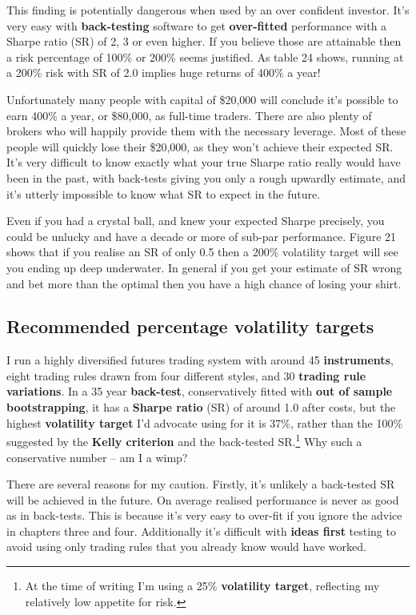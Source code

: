 This finding is potentially dangerous when used by an over confident investor. It's very easy with \textbf{back-testing} software to get \textbf{over-fitted} performance with a Sharpe ratio (SR) of 2, 3 or even higher. If you believe those are attainable then a risk percentage of 100\% or 200\% seems justified. As table 24 shows, running at a 200\% risk with SR of 2.0 implies huge returns of 400\% a year!

Unfortunately many people with capital of \$20,000 will conclude it's possible to earn 400\% a year, or \$80,000, as full-time traders. There are also plenty of brokers who will happily provide them with the necessary leverage. Most of these people will quickly lose their \$20,000, as they won't achieve their expected SR. It's very difficult to know exactly what your true Sharpe ratio really would have been in the past, with back-tests giving you only a rough upwardly estimate, and it's utterly impossible to know what SR to expect in the future.

Even if you had a crystal ball, and knew your expected Sharpe precisely, you could be unlucky and have a decade or more of sub-par performance. Figure 21 shows that if you realise an SR of only 0.5 then a 200\% volatility target will see you ending up deep underwater. In general if you get your estimate of SR wrong and bet more than the optimal then you have a high chance of losing your shirt.

\subsection*{Recommended percentage volatility targets}

I run a highly diversified futures trading system with around 45 \textbf{instruments}, eight trading rules drawn from four different styles, and 30 \textbf{trading rule variations}. In a 35 year \textbf{back-test}, conservatively fitted with \textbf{out of sample bootstrapping}, it has a \textbf{Sharpe ratio} (SR) of around 1.0 after costs, but the highest \textbf{volatility target} I'd advocate using for it is 37\%, rather than the 100\% suggested by the \textbf{Kelly criterion} and the back-tested SR.\footnote{At the time of writing I'm using a 25\% \textbf{volatility target}, reflecting my relatively low appetite for risk.} Why such a conservative number -- am I a wimp?

There are several reasons for my caution. Firstly, it's unlikely a back-tested SR will be achieved in the future. On average realised performance is never as good as in back-tests. This is because it's very easy to over-fit if you ignore the advice in chapters three and four. Additionally it's difficult with \textbf{ideas first} testing to avoid using only trading rules that you already know would have worked.

